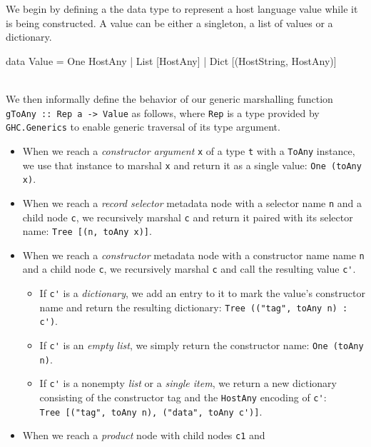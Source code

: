 \documentclass[preprint]{sigplanconf}
\begin{document}
We begin by defining a the data type to represent a host language value while
it is being constructed. A value can be either a singleton, a list of
values or a dictionary.\\
\begin{code}
  data Value
    = One HostAny
    | List [HostAny]
    | Dict [(HostString, HostAny)]
\end{code}\\
We then informally define the behavior of our generic marshalling function
\lstinline!gToAny :: Rep a -> Value! as follows, where \lstinline!Rep! is
a type provided by \lstinline!GHC.Generics! to enable generic traversal
of its type argument.

\begin{itemize}
\item
  When we reach a \emph{constructor argument} \lstinline!x! of a type
  \lstinline!t! with a \lstinline!ToAny! instance, we use that instance to
  marshal \lstinline!x! and return it as a single value:
  \lstinline!One (toAny x)!.
\item
  When we reach a \emph{record selector} metadata node with a selector
  name \lstinline!n! and a child node \lstinline!c!, we recursively marshal
  \lstinline!c! and return it paired with its selector name:
  \lstinline!Tree [(n, toAny x)]!.
\item
  When we reach a \emph{constructor} metadata node with a constructor name
  name \lstinline!n! and a child node \lstinline!c!, we recursively marshal
  \lstinline!c! and call the resulting value \lstinline!c'!.
  \begin{itemize}
  \item
    If \lstinline!c'! is a \emph{dictionary}, we add an entry to it to mark the
    value's constructor name and return the resulting dictionary:
    \lstinline!Tree (("tag", toAny n) : c')!.
  \item
    If \lstinline!c'! is an \emph{empty list}, we simply return the constructor
    name:
    \lstinline!One (toAny n)!.
  \item
    If \lstinline!c'! is a nonempty \emph{list} or a \emph{single item},
    we return a new dictionary consisting of the constructor tag and the
    \lstinline!HostAny! encoding of \lstinline!c'!:\\
    \lstinline!Tree [("tag", toAny n), ("data", toAny c')]!.
  \end{itemize}
\item
  When we reach a \emph{product} node with child nodes \lstinline!c1! and

\end{itemize}
\end{document}
